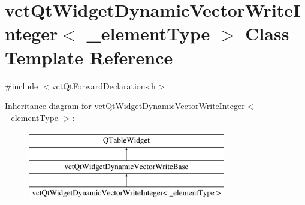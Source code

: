 \hypertarget{classvct_qt_widget_dynamic_vector_write_integer}{}\section{vct\+Qt\+Widget\+Dynamic\+Vector\+Write\+Integer$<$ \+\_\+element\+Type $>$ Class Template Reference}
\label{classvct_qt_widget_dynamic_vector_write_integer}


{\ttfamily \#include $<$vct\+Qt\+Forward\+Declarations.\+h$>$}

Inheritance diagram for vct\+Qt\+Widget\+Dynamic\+Vector\+Write\+Integer$<$ \+\_\+element\+Type $>$\+:\begin{figure}[H]
\begin{center}
\leavevmode
\includegraphics[height=3.000000cm]{d8/d73/classvct_qt_widget_dynamic_vector_write_integer}
\end{center}
\end{figure}
